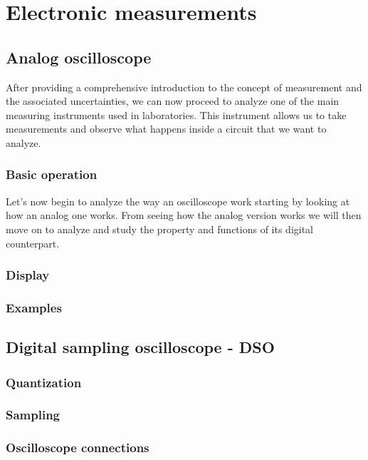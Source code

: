 \documentclass[../main.tex]{subfiles}
\begin{document}
\clearpage
\thispagestyle{empty}
\section{Electronic measurements}

\subsection{Analog oscilloscope}

After providing a comprehensive introduction to the concept of measurement and the associated uncertainties, we can now proceed to analyze one of the main measuring instruments used in laboratories. This instrument allows us to take measurements and observe what happens inside a circuit that we want to analyze.

\subsubsection{Basic operation}

Let's now begin to analyze the way an oscilloscope work starting by looking at how an analog one works. From seeing how the analog version works we will then move on to analyze and study the property and functions of its digital counterpart.


\subsubsection{Display}

\subsubsection{Examples}

\subsection{Digital sampling oscilloscope - DSO}

\subsubsection{Quantization}


\subsubsection{Sampling}


\subsubsection{Oscilloscope connections}
\end{document}
